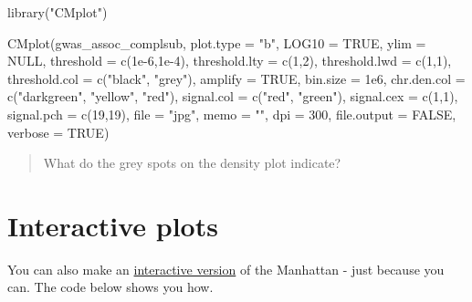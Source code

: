 \documentclass[
]{book}
\newenvironment{Shaded}{\begin{snugshade}}{\end{snugshade}}
\newcommand{\AttributeTok}[1]{\textcolor[rgb]{0.77,0.63,0.00}{#1}}
\newcommand{\ConstantTok}[1]{\textcolor[rgb]{0.00,0.00,0.00}{#1}}
\newcommand{\DecValTok}[1]{\textcolor[rgb]{0.00,0.00,0.81}{#1}}
\newcommand{\FloatTok}[1]{\textcolor[rgb]{0.00,0.00,0.81}{#1}}
\newcommand{\FunctionTok}[1]{\textcolor[rgb]{0.00,0.00,0.00}{#1}}
\newcommand{\NormalTok}[1]{#1}
\newcommand{\StringTok}[1]{\textcolor[rgb]{0.31,0.60,0.02}{#1}}
\begin{document}
\begin{Shaded}
\begin{Highlighting}[]
\FunctionTok{library}\NormalTok{(}\StringTok{"CMplot"}\NormalTok{)}

\FunctionTok{CMplot}\NormalTok{(gwas\_assoc\_complsub,}
       \AttributeTok{plot.type =} \StringTok{"b"}\NormalTok{, }\AttributeTok{LOG10 =} \ConstantTok{TRUE}\NormalTok{, }\AttributeTok{ylim =} \ConstantTok{NULL}\NormalTok{,}
       \AttributeTok{threshold =} \FunctionTok{c}\NormalTok{(}\FloatTok{1e{-}6}\NormalTok{,}\FloatTok{1e{-}4}\NormalTok{), }\AttributeTok{threshold.lty =} \FunctionTok{c}\NormalTok{(}\DecValTok{1}\NormalTok{,}\DecValTok{2}\NormalTok{), }\AttributeTok{threshold.lwd =} \FunctionTok{c}\NormalTok{(}\DecValTok{1}\NormalTok{,}\DecValTok{1}\NormalTok{), }\AttributeTok{threshold.col =} \FunctionTok{c}\NormalTok{(}\StringTok{"black"}\NormalTok{, }\StringTok{"grey"}\NormalTok{),}
       \AttributeTok{amplify =} \ConstantTok{TRUE}\NormalTok{,}
       \AttributeTok{bin.size =} \FloatTok{1e6}\NormalTok{, }\AttributeTok{chr.den.col =} \FunctionTok{c}\NormalTok{(}\StringTok{"darkgreen"}\NormalTok{, }\StringTok{"yellow"}\NormalTok{, }\StringTok{"red"}\NormalTok{),}
       \AttributeTok{signal.col =} \FunctionTok{c}\NormalTok{(}\StringTok{"red"}\NormalTok{, }\StringTok{"green"}\NormalTok{), }\AttributeTok{signal.cex =} \FunctionTok{c}\NormalTok{(}\DecValTok{1}\NormalTok{,}\DecValTok{1}\NormalTok{), }\AttributeTok{signal.pch =} \FunctionTok{c}\NormalTok{(}\DecValTok{19}\NormalTok{,}\DecValTok{19}\NormalTok{),}
       \AttributeTok{file =} \StringTok{"jpg"}\NormalTok{, }\AttributeTok{memo =} \StringTok{""}\NormalTok{, }\AttributeTok{dpi =} \DecValTok{300}\NormalTok{, }\AttributeTok{file.output =} \ConstantTok{FALSE}\NormalTok{, }\AttributeTok{verbose =} \ConstantTok{TRUE}\NormalTok{)}
\end{Highlighting}
\end{Shaded}

\begin{quote}
What do the grey spots on the density plot indicate?
\end{quote}

\hypertarget{interactive-plots}{%
\section{Interactive plots}\label{interactive-plots}}

You can also make an \href{https://r-graph-gallery.com/101_Manhattan_plot.html}{interactive version} of the Manhattan - just because you can. The code below shows you how.
\end{document}
